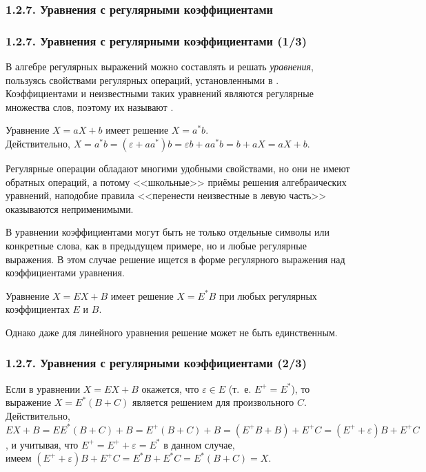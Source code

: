 \subsubsection{1.2.7. Уравнения с регулярными коэффициентами}\label{1.2.7.}
\begin{frame}
\frametitle{1.2.7. Уравнения с регулярными коэффициентами (1/3)}
В алгебре регулярных выражений можно 
составлять и решать {\em уравнения}, пользуясь 
свойствами регулярных операций, установленными
в .
Коэффициентами и неизвестными таких
уравнений являются регулярные множества 
слов, поэтому их называют
.
\begin{example}
Уравнение $X=aX+b$ имеет решение $X=a^*b$.\\
Действительно, $X=a^*b=(\varepsilon+aa^*)b
=\varepsilon b +aa^*b = b+aX=aX+b$.
\end{example}
\begin{digress}
Регулярные операции обладают многими 
удобными свойствами, но они не имеют
обратных операций, 
а потому <<школьные>> приёмы
решения алгебраических уравнений,
наподобие правила 
<<перенести неизвестные в левую часть>>
оказываются неприменимыми.
\end{digress}
В уравнении коэффициентами могут 
быть не только отдельные символы или конкретные слова,
как в предыдущем примере, 
но и любые регулярные выражения.
В этом случае решение ищется в форме
регулярного выражения над коэффициентами
уравнения.
\begin{example}
Уравнение $X=EX+B$ имеет решение $X=E^*B$
при любых регулярных коэффициентах $E$ и $B$.
\end{example} 

Однако даже для линейного уравнения решение
может не быть единственным.
\end{frame}

\begin{frame}
\frametitle{1.2.7. Уравнения с регулярными коэффициентами (2/3)}
\begin{example}
Если в уравнении $X=EX+B$
окажется, что $\varepsilon\in E$
(т.~е. $E^+=E^*$), то
выражение $X=E^*(B+C)$ 
является решением для произвольного $C$.  
Действительно, $EX +B= EE^*(B+C) +B =
E^+(B+C) +B= (E^+B+B)+E^+C =
(E^++\varepsilon)B + E^+C$,
и учитывая, что $E^+=E^++\varepsilon=E^*$  в данном случае, \\имеем 
$(E^++\varepsilon)B + E^+C = E^*B+E^*C=E^*(B+C)=X$.
\end{example}

\medskip
{}

\end{frame}


